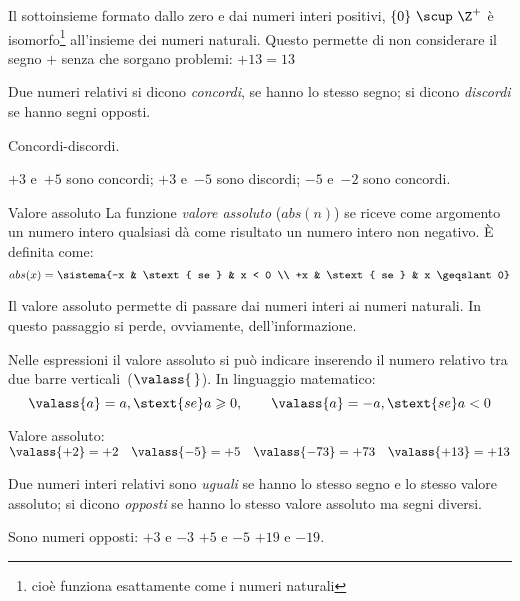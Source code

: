\begin{osservazione}{}{}
Il sottoinsieme formato dallo zero e dai numeri interi positivi, 
\(\{0\} ~\scup~ \Z^+\) 
è isomorfo\footnote{
cioè funziona esattamente come i numeri naturali} 
all'insieme dei numeri naturali.
Questo permette di non considerare il segno \(+\) senza che sorgano 
problemi: \(+13 = 13\)
\end{osservazione}

\begin{definizione}{}{}
Due numeri relativi si dicono \emph{concordi}, se hanno lo stesso segno; 
si dicono \emph{discordi} se hanno segni opposti.
\end{definizione}

\begin{esempio}{}{}
Concordi-discordi.

\(+3\) e~\(+5\) sono concordi; \quad 
\(+3\) e~\(-5\) sono discordi; \quad 
\(-5\) e~\(-2\) sono concordi.
\end{esempio}

\begin{definizione}{Valore assoluto}{}
La funzione \emph{valore assoluto} (\(abs(n)\)) se riceve come argomento 
un numero intero qualsiasi dà come risultato un numero intero non negativo.
È definita come:
\[abs(x) = 
\sistema{-x & \stext{ se } & x < 0 \\ +x & \stext{ se } & x \geqslant 0}\]
\end{definizione}

Il valore assoluto permette di passare dai numeri interi ai numeri naturali. 
In questo passaggio si perde, ovviamente, dell'informazione.

Nelle espressioni il valore assoluto si può indicare inserendo il numero 
relativo tra due barre verticali~(\(\valass{\,}\)). In linguaggio
matematico:
\[\valass{a}=a,\stext{ se }a\geqslant0,\qquad 
  \valass{a}=-a,\stext{ se }a<0\]

\begin{esempio}{}{}
Valore assoluto: \qquad
\(\valass{+2}=+2 \quad \valass{-5}=+5 \quad 
\valass{-73}=+73 \quad \valass{+13}=+13\)
\end{esempio}

\begin{definizione}{}{}
Due numeri interi relativi sono \emph{uguali} se hanno lo stesso segno e 
lo stesso valore assoluto;
si dicono \emph{opposti} se hanno lo stesso valore assoluto ma segni 
diversi.
\end{definizione}

\begin{esempio}{}{}
Sono numeri opposti: \qquad \(+3\) e \(-3\) \quad \(+5\) e \(-5\) 
\quad \(+19\) e \(-19\).
\end{esempio}

